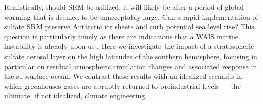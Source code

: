 \documentclass[draft,grl]{AGUTeX}  %
\begin{document}
\begin{article}

Realistically, should SRM be utilized, it will likely be after a period of global warming that is deemed to be unacceptably large. Can a rapid implementation of sulfate SRM preserve Antarctic ice sheets and curb potential sea level rise? This question is particularly timely as there are indications that a WAIS marine instability is already upon us \citep{favier14,rignot14}. Here we investigate the impact of a stratospheric sulfate aerosol layer on the high latitudes of the southern hemisphere, focusing in particular on residual atmospheric circulation changes and associated response in the subsurface ocean. We contrast these results with an idealized scenario in which greenhouses gases are abruptly returned to preindustrial levels --- the ultimate, if not idealized, climate engineering. 


\end{article}
\end{document}
